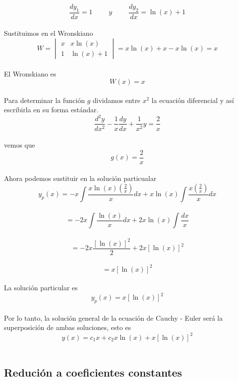 \documentclass[12pt,letterpaper]{article}
\begin{document}
$$\frac{dy_{1}}{dx}=1\hspace{1cm}y\hspace{1cm}\frac{dy_{2}}{dx}=\ln(x)+1$$\\
Sustituimos en el Wronskiano\\
$$W=\begin{vmatrix}
x&x\ln(x)\\
1&\ln(x)+1
\end{vmatrix}=x\ln(x)+x-x\ln(x)=x$$\\
El Wronskiano es\\
$$W(x)=x$$\\
Para determinar la función $g$ dividamos entre $x^{2}$ la ecuación diferencial y así escribirla en su forma estándar.\\
$$\frac{d^{2}y}{dx^{2}}-\frac{1}{x}\frac{dy}{dx}+\frac{1}{x^{2}}y=\frac{2}{x}$$\\
vemos que\\
$$g(x)=\frac{2}{x}$$\\
Ahora podemos sustituir en la solución particualar\\
$$y_{p}(x)=-x\int{\frac{x\ln(x)\left(\frac{2}{x}\right)}{x}dx}+x\ln(x)\int{\frac{x\left(\frac{2}{x}\right)}{x}dx}$$\\
$$=-2x\int{\frac{\ln(x)}{x}dx}+2x\ln(x)\int{\frac{dx}{x}}$$\\
$$=-2x\frac{[\ln(x)]^{2}}{2}+2x[\ln(x)]^{2}$$\\
$$=x[\ln(x)]^{2}$$\\
La solución particular es\\
$$y_{p}(x)=x[\ln(x)]^{2}$$\\
Por lo tanto, la solución general de la ecuación de Cauchy - Euler será la superposición de ambas soluciones, esto es\\
$$y(x)=c_{1}x+c_{2}x\ln(x)+x[\ln(x)]^{2}$$\\

\subsection{\large Redución a coeficientes constantes}
\end{document}
